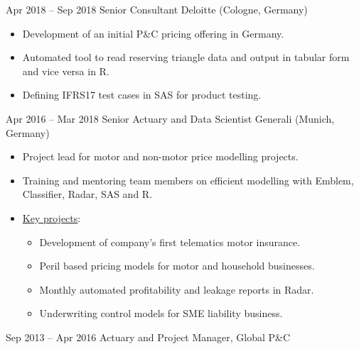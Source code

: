 \documentclass[a4paper,]{fortysecondscv}
\begin{document}
\begin{cvtable}
        \vspace{\topsep}
		\cvitem
			{Apr 2018 -- Sep 2018}
			{Senior Consultant}
			{Deloitte (Cologne, Germany)}
			{
				\vspace{-\topsep}
				\begin{itemize}[nosep, leftmargin=0pt] %
  					\item Development of an initial P\&C pricing offering in Germany.
  					\item Automated tool to read reserving triangle data and output in tabular form and vice versa in R.
  					\item Defining IFRS17 test cases in SAS for product testing.
				\end{itemize}
			}
        \vspace{\topsep}
		\cvitem
			{Apr 2016 -- Mar 2018}
			{Senior Actuary and Data Scientist}
			{Generali (Munich, Germany)}
			{
				\vspace{-\topsep}
				\begin{itemize}[nosep, leftmargin=0pt] %
                    \item Project lead for motor and non-motor price modelling projects.
                    \item Training and mentoring team members on efficient modelling with Emblem, Classifier, Radar, SAS and R.
                    \item \underline{Key projects}:
					\begin{itemize}
                        \item Development of company's first telematics motor insurance.
                        \item Peril based pricing models for motor and household businesses.
                        \item Monthly automated profitability and leakage reports in Radar.
                        \item Underwriting control models for SME liability business.
                    \end{itemize}
				\end{itemize}
			}
        \vspace{\topsep}
		\cvitem
			{Sep 2013 -- Apr 2016}
			{Actuary and Project Manager, Global P\&C}

\end{cvtable}
\end{document}
